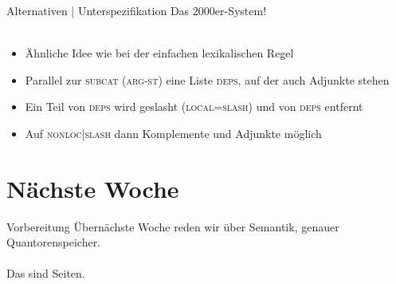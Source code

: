 \begin{frame}
  {Alternativen | Unterspezifikation}
  \onslide<+->
  \onslide<+->
  Das \alert{2000er-System}! \\
  \\
  \Zeile
  \begin{itemize}[<+->]
    \item Ähnliche Idee wie bei der einfachen lexikalischen Regel
    \item Parallel zur \textsc{subcat} (\textsc{arg-st}) eine Liste \textsc{deps}, auf der auch Adjunkte stehen
    \item Ein Teil von \textsc{deps} wird geslasht (\textsc{local}=\textsc{slash}) und von \textsc{deps} entfernt
    \item Auf \textsc{nonloc|slash} dann Komplemente und Adjunkte möglich
  \end{itemize}
\end{frame}

\section{Nächste Woche}

\begin{frame}
  {Vorbereitung}
  \centering 
  \large
  \alert{Übernächste} Woche reden wir über Semantik, genauer Quantorenspeicher.\\
  \Zeile
  \\
  \Viertelzeile
  Das sind  Seiten.\\
\end{frame}
